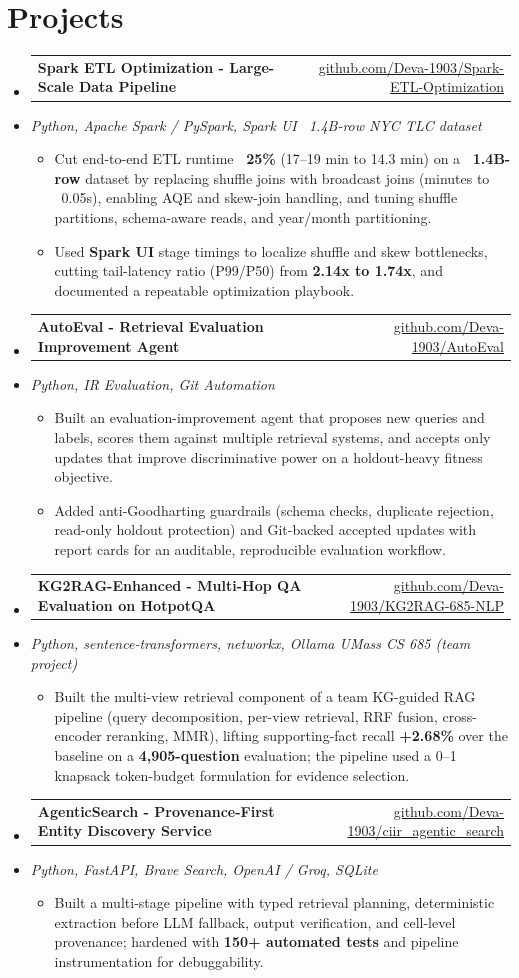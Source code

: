 \documentclass[letterpaper,10pt]{article}
\makeatletter
\newcommand{\resumeItem}[1]{
  \item\small{#1\vspace{-1pt}}
}
\newcommand{\resumeProjectHeading}[2]{
    \item
    \begin{tabular*}{0.985\textwidth}[t]{l@{\extracolsep{\fill}}r}
      \small\textbf{#1} & \small #2 \\
    \end{tabular*}\vspace{-5pt}
}
\newcommand{\resumeProjectSubheading}[1]{
  \vspace{-2pt}\item[] {\small\textcolor{ResumeSlate}{\emph{#1}}}\vspace{-3pt}
}
\newcommand{\resumeSubHeadingListStart}{\begin{itemize}[leftmargin=0.0in, label={}, itemsep=2pt, topsep=2pt]}
\newcommand{\resumeSubHeadingListEnd}{\end{itemize}}
\newcommand{\resumeItemListStart}{\begin{itemize}[leftmargin=0.18in, itemsep=2pt, topsep=1pt]}
\newcommand{\resumeItemListEnd}{\end{itemize}\vspace{-4pt}}
\makeatother
\begin{document}
\section{Projects}
\resumeSubHeadingListStart
  \resumeProjectHeading
    {Spark ETL Optimization - Large-Scale Data Pipeline}
    {\href{https://github.com/Deva-1903/Spark-ETL-Optimization}{github.com/Deva-1903/Spark-ETL-Optimization}}
  \resumeProjectSubheading{Python, Apache Spark / PySpark, Spark UI \enspace\textbar\enspace ~1.4B-row NYC TLC dataset}
    \resumeItemListStart
      \resumeItem{Cut end-to-end ETL runtime \textbf{~25\%} (17--19 min to 14.3 min) on a \textbf{~1.4B-row} dataset by replacing shuffle joins with broadcast joins (minutes to ~0.05s), enabling AQE and skew-join handling, and tuning shuffle partitions, schema-aware reads, and year/month partitioning.}
      \resumeItem{Used \textbf{Spark UI} stage timings to localize shuffle and skew bottlenecks, cutting tail-latency ratio (P99/P50) from \textbf{2.14x to 1.74x}, and documented a repeatable optimization playbook.}
    \resumeItemListEnd
  \resumeProjectHeading
    {AutoEval - Retrieval Evaluation Improvement Agent}
    {\href{https://github.com/Deva-1903/AutoEval}{github.com/Deva-1903/AutoEval}}
  \resumeProjectSubheading{Python, IR Evaluation, Git Automation}
    \resumeItemListStart
      \resumeItem{Built an evaluation-improvement agent that proposes new queries and labels, scores them against multiple retrieval systems, and accepts only updates that improve discriminative power on a holdout-heavy fitness objective.}
      \resumeItem{Added anti-Goodharting guardrails (schema checks, duplicate rejection, read-only holdout protection) and Git-backed accepted updates with report cards for an auditable, reproducible evaluation workflow.}
    \resumeItemListEnd
  \resumeProjectHeading
    {KG2RAG-Enhanced - Multi-Hop QA Evaluation on HotpotQA}
    {\href{https://github.com/Deva-1903/KG2RAG-685-NLP}{github.com/Deva-1903/KG2RAG-685-NLP}}
  \resumeProjectSubheading{Python, sentence-transformers, networkx, Ollama \enspace\textbar\enspace UMass CS 685 (team project)}
    \resumeItemListStart
      \resumeItem{Built the multi-view retrieval component of a team KG-guided RAG pipeline (query decomposition, per-view retrieval, RRF fusion, cross-encoder reranking, MMR), lifting supporting-fact recall \textbf{+2.68\%} over the baseline on a \textbf{4,905-question} evaluation; the pipeline used a 0--1 knapsack token-budget formulation for evidence selection.}
    \resumeItemListEnd
  \resumeProjectHeading
    {AgenticSearch - Provenance-First Entity Discovery Service}
    {\href{https://github.com/Deva-1903/ciir_agentic_search}{github.com/Deva-1903/ciir\_agentic\_search}}
  \resumeProjectSubheading{Python, FastAPI, Brave Search, OpenAI / Groq, SQLite}
    \resumeItemListStart
      \resumeItem{Built a multi-stage pipeline with typed retrieval planning, deterministic extraction before LLM fallback, output verification, and cell-level provenance; hardened with \textbf{150+ automated tests} and pipeline instrumentation for debuggability.}
    \resumeItemListEnd
\resumeSubHeadingListEnd
\vspace{-4pt}
\end{document}
